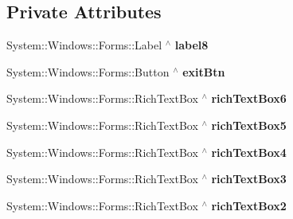 \subsection*{Private Attributes}
\begin{DoxyCompactItemize}
\item 
\mbox{\label{class_gaze_track_g_u_i_1_1_help_form_aaa5fe087f4160afa36e1d80c74156579}} 
System\+::\+Windows\+::\+Forms\+::\+Label $^\wedge$ {\bfseries label8}
\item 
\mbox{\label{class_gaze_track_g_u_i_1_1_help_form_af9f13f8a629b767b341432a0030dfc36}} 
System\+::\+Windows\+::\+Forms\+::\+Button $^\wedge$ {\bfseries exit\+Btn}
\item 
\mbox{\label{class_gaze_track_g_u_i_1_1_help_form_a2ff687bf84dcd326209d68a5dc8ce673}} 
System\+::\+Windows\+::\+Forms\+::\+Rich\+Text\+Box $^\wedge$ {\bfseries rich\+Text\+Box6}
\item 
\mbox{\label{class_gaze_track_g_u_i_1_1_help_form_abb74f4e40ef94f97daf50150e8258d44}} 
System\+::\+Windows\+::\+Forms\+::\+Rich\+Text\+Box $^\wedge$ {\bfseries rich\+Text\+Box5}
\item 
\mbox{\label{class_gaze_track_g_u_i_1_1_help_form_aa44193690ebc1131e73689534f6fe1cb}} 
System\+::\+Windows\+::\+Forms\+::\+Rich\+Text\+Box $^\wedge$ {\bfseries rich\+Text\+Box4}
\item 
\mbox{\label{class_gaze_track_g_u_i_1_1_help_form_ac6861c16d15c34ea73597909fce2bf8b}} 
System\+::\+Windows\+::\+Forms\+::\+Rich\+Text\+Box $^\wedge$ {\bfseries rich\+Text\+Box3}
\item 
\mbox{\label{class_gaze_track_g_u_i_1_1_help_form_af44f180da06ea283ff05d016b3eb3949}} 
System\+::\+Windows\+::\+Forms\+::\+Rich\+Text\+Box $^\wedge$ {\bfseries rich\+Text\+Box2}
\item 
\mbox{\label{class_gaze_track_g_u_i_1_1_help_form_a397095a0c72e317618fb249970caeda5}} 

\end{DoxyCompactItemize}
